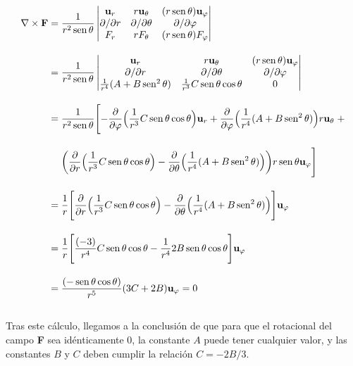 \begin{align*}
    \nabla \times \textbf{F}
    =\; &
    \frac{1}{r^2 \operatorname{sen} \theta}
    \begin{vmatrix}
        \mathbf{u}_{r}        & r\mathbf{u_{\theta}}       & (r\operatorname{sen}\theta)\mathbf{u_{\varphi}} \\
        \partial / \partial r & \partial / \partial \theta & \partial / \partial \varphi       \\
        F_r                   & r F_\theta                 & (r \operatorname{sen}\theta)F_\varphi           \\
    \end{vmatrix}
    \\[10pt]
    =\; &
    \frac{1}{r^2 \operatorname{sen} \theta}
    \begin{vmatrix}
        \mathbf{u}_{r}                      & r\mathbf{u_{\theta}}                 & (r\operatorname{sen}\theta)\mathbf{u_{\varphi}} \\
        \partial / \partial r               & \partial / \partial \theta           & \partial / \partial \varphi       \\
        \frac{1}{r^4}(A + B \operatorname{sen}^2{\theta}) & \frac{1}{r^3}C \operatorname{sen}\theta \cos\theta & 0                                 \\
    \end{vmatrix}     \\[10pt]
    =\; &   \frac{1}{r^2 \operatorname{sen} \theta} \Biggl[
        - \frac{\partial}{\partial \varphi} \Bigl( \frac{1}{r^3} C \operatorname{sen}\theta \cos\theta \Bigr) \mathbf{u}_{r}
        + \frac{\partial}{\partial \varphi} \Bigl( \frac{1}{r^4} (A + B \operatorname{sen}^2{\theta})  \Bigr) r\mathbf{u}_{\theta} \; +  \\[10pt]
        & \biggl( \frac{\partial}{\partial r} \Bigl( \frac{1}{r^3} C \operatorname{sen}\theta \cos\theta   \Bigr)
        -  \frac{\partial}{\partial \theta} \Bigl( \frac{1}{r^4} (A + B \operatorname{sen}^2{\theta})
        \Bigr) \biggr) r \operatorname{sen}\theta \mathbf{u}_{\varphi}
        \Biggr] \\[10pt]
    =\; &  \frac{1}{r}
    \Biggl[
        \frac{\partial}{\partial r}
        \Bigl( \frac{1}{r^3} C \operatorname{sen}\theta \cos\theta
        \Bigr)
        -
        \frac{\partial}{\partial \theta}
        \Bigl( \frac{1}{r^4} (A + B \operatorname{sen}^2{\theta})
        \Bigr)
        \Biggr] \mathbf{u}_{\varphi}\\[10pt]
    =\; &  \frac{1}{r}
    \Biggl[
        \frac{(-3)}{r^4} C \operatorname{sen}\theta \cos\theta
        -
        \frac{1}{r^4} 2 B \operatorname{sen}\theta \cos\theta
        \Biggr] \mathbf{u}_{\varphi}\\[10pt]
    =\; &
    \frac{(- \operatorname{sen}\theta \cos\theta)}{r^5} (3C + 2B)  \mathbf{u}_{\varphi}  = 0 \\[10pt]
\end{align*}


Tras este cálculo, llegamos a la conclusión de que para que el rotacional del campo \textbf{F} sea idénticamente 0,
la constante $A$ puede tener cualquier valor,
y las constantes $B$ y $C$ deben cumplir la relación $C = -2 B / 3$.






